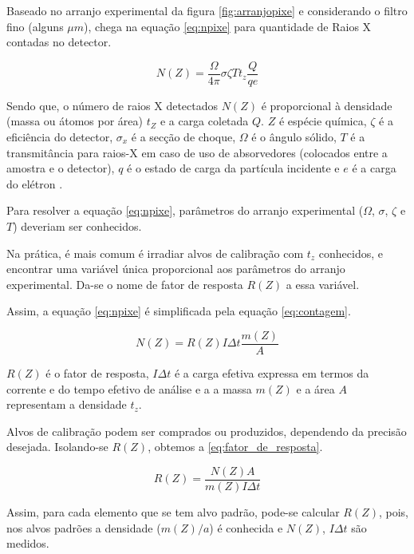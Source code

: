 Baseado no arranjo experimental da figura \ref{fig:arranjopixe} e
considerando o filtro fino (alguns $\mu m$),
\citep{tabacniks2000} chega na equação \ref{eq:npixe} para quantidade de Raios X
contadas no detector. 

\begin{equation}
  \label{eq:npixe}
  N(Z) = \frac{\Omega}{4\pi} \sigma \zeta T t_z \frac{Q}{qe}
\end{equation}

Sendo que, o número de raios X detectados $N(Z)$ é proporcional à 
densidade (massa ou átomos por área) $t_Z$ e a carga coletada $Q$.
$Z$ é espécie química, $\zeta$ é a eficiência do detector, 
$\sigma_x$ é a secção de choque, $\Omega$ é o ângulo sólido, 
$T$ é a transmitância para raios-X em caso de uso de absorvedores 
(colocados entre a amostra e o detector), $q$ é o estado de carga da 
partícula incidente e $e$ é a carga do elétron \citep{tabacniks1983}.

Para resolver a equação \ref{eq:npixe}, parâmetros do arranjo experimental
($\Omega$, $\sigma$, $\zeta$ e $T$) deveriam ser conhecidos. 

Na prática, é mais comum é irradiar alvos de calibração com $t_z$ conhecidos,
e encontrar uma variável única proporcional aos parâmetros do arranjo experimental.
Da-se o nome de fator de resposta $R(Z)$ a essa variável.

Assim, a equação \ref{eq:npixe} é simplificada pela equação \ref{eq:contagem}.

\begin{equation}
  \label{eq:contagem}
  N(Z) = R(Z) I\Delta t \frac{m(Z)}{A}
\end{equation}

$R(Z)$ é o fator de resposta, $I\Delta t$ é a carga efetiva expressa
em termos da corrente e do tempo efetivo de análise e a 
a massa $m(Z)$ e a área $A$ representam a densidade $t_z$. 

Alvos de calibração podem ser comprados ou produzidos, dependendo da 
precisão desejada. Isolando-se $R(Z)$, obtemos a \ref{eq:fator_de_resposta}.

\begin{equation}
  \label{eq:fator_de_resposta}
  R(Z) = \frac{N(Z) A}{m(Z)I \Delta t}
\end{equation}

Assim, para cada elemento que se tem alvo padrão, pode-se calcular $R(Z)$,
pois, nos alvos padrões a densidade ($m(Z)/a$) é conhecida e $N(Z)$, $I \Delta t$ são medidos. 

